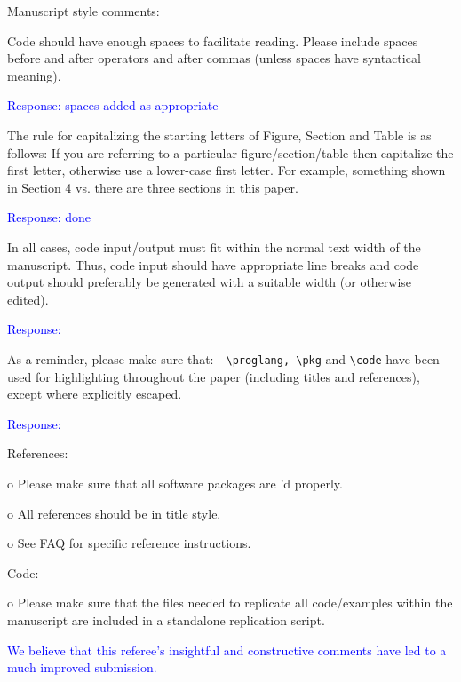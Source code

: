 \documentclass[12pt]{article}
\begin{document}
Manuscript style comments:

Code should have enough spaces to facilitate reading.  Please include
spaces before and after operators and after commas (unless spaces have
syntactical meaning).

\textcolor{blue}{Response: spaces added as appropriate}

The rule for capitalizing the starting letters of Figure, Section and
Table is as follows: If you are referring to a particular
figure/section/table then capitalize the first letter, otherwise use a
lower-case first letter. For example, something shown in Section 4
vs. there are three sections in this paper.

\textcolor{blue}{Response: done}

In all cases, code input/output must fit within the normal text
width of the manuscript.  Thus, code input should have appropriate
line breaks and code output should preferably be generated with a
suitable width (or otherwise edited).

\textcolor{blue}{Response:}

As a reminder, please make sure that: - \verb+\proglang, \pkg+ and
\verb+\code+ have been used for highlighting throughout the paper
(including titles and references), except where explicitly escaped.

\textcolor{blue}{Response:}

References:



o Please make sure that all software packages are \cite{}'d properly.

o All references should be in title style.

o See FAQ for specific reference instructions.


Code:

o Please make sure that the files needed to replicate all
code/examples within the manuscript are included in a standalone
replication script.


\textcolor{blue}{We believe that this referee's insightful and
  constructive comments have led to a much improved submission.}
\end{document}
